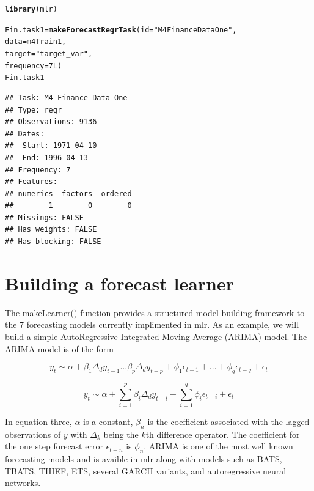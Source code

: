 \documentclass{article}\usepackage[]{graphicx}\usepackage[]{color}
\makeatletter
\newcommand{\hlnum}[1]{\textcolor[rgb]{0.686,0.059,0.569}{#1}}%
\newcommand{\hlstr}[1]{\textcolor[rgb]{0.192,0.494,0.8}{#1}}%
\newcommand{\hlstd}[1]{\textcolor[rgb]{0.345,0.345,0.345}{#1}}%
\newcommand{\hlkwb}[1]{\textcolor[rgb]{0.69,0.353,0.396}{#1}}%
\newcommand{\hlkwc}[1]{\textcolor[rgb]{0.333,0.667,0.333}{#1}}%
\newcommand{\hlkwd}[1]{\textcolor[rgb]{0.737,0.353,0.396}{\textbf{#1}}}%
\newenvironment{kframe}{%
 \def\at@end@of@kframe{}%
 \ifinner\ifhmode%
  \def\at@end@of@kframe{\end{minipage}}%
  \begin{minipage}{\columnwidth}%
 \fi\fi%
 \def\FrameCommand##1{\hskip\@totalleftmargin \hskip-\fboxsep
 \colorbox{shadecolor}{##1}\hskip-\fboxsep
     \hskip-\linewidth \hskip-\@totalleftmargin \hskip\columnwidth}%
 \MakeFramed {\advance\hsize-\width
   \@totalleftmargin\z@ \linewidth\hsize
   \@setminipage}}%
 {\par\unskip\endMakeFramed%
 \at@end@of@kframe}
\newenvironment{knitrout}{}{} %
\theoremstyle{definition}
\newcommand\code{\@codex}
\def\@codex#1{{\normalfont\ttfamily\hyphenchar\font=-1 #1}}
\newcommand{\pkg}[1]{{\fontseries{b}\selectfont #1}}
\makeatother
\begin{document}
\begin{knitrout}
\color{fgcolor}\begin{kframe}
\begin{alltt}
\hlkwd{library}\hlstd{(mlr)}
\end{alltt}


{\ttfamily\noindent\itshape\color{messagecolor}{\#\# Loading required package: ParamHelpers}}\begin{alltt}
\hlstd{Fin.task1} \hlkwb{=} \hlkwd{makeForecastRegrTask}\hlstd{(}\hlkwc{id} \hlstd{=} \hlstr{"M4 Finance Data One"}\hlstd{,}
                                 \hlkwc{data} \hlstd{= m4Train1,}
                                 \hlkwc{target} \hlstd{=} \hlstr{"target_var"}\hlstd{,}
                                 \hlkwc{frequency} \hlstd{=} \hlnum{7L}\hlstd{)}
\hlstd{Fin.task1}
\end{alltt}
\begin{verbatim}
## Task: M4 Finance Data One
## Type: regr
## Observations: 9136
## Dates:
##  Start: 1971-04-10 
##  End: 1996-04-13
## Frequency: 7
## Features:
## numerics  factors  ordered 
##        1        0        0 
## Missings: FALSE
## Has weights: FALSE
## Has blocking: FALSE
\end{verbatim}
\end{kframe}
\end{knitrout}

\section{Building a forecast learner}

The \code{makeLearner()} function provides a structured model building framework to the 7 forecasting models currently implimented in \pkg{mlr}. As an example, we will build a simple AutoRegressive Integrated Moving Average (ARIMA) model. The ARIMA model is of the form

\begin{equation}
y_t \sim \alpha + \beta_1 \Delta_d y_{t-1} ... \beta_p \Delta_d y_{t-p} + \phi_1 \epsilon_{t-1} + ... + \phi_q \epsilon_{t-q} + \epsilon_t
\end{equation}

\begin{equation}
y_t \sim \alpha + \sum_{i=1}^p \beta_i \Delta_d y_{t-i} + \sum_{i=1}^q \phi_i \epsilon_{t-i} +\epsilon_t
\end{equation}

In equation three, $\alpha$ is a constant, $\beta_n$ is the coefficient associated with the lagged observations of $y$ with $\Delta_k$ being the $k$th difference operator. The coefficient for the one step forecast error $\epsilon_{t-n}$ is $\phi_n$. ARIMA is one of the most well known forecasting models and is avaible in mlr along with models such as BATS, TBATS, THIEF, ETS, several GARCH variants, and autoregressive neural networks.
\end{document}
